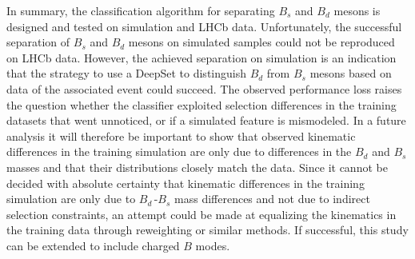 In summary, the classification algorithm for separating $B_s$ and $B_d$ mesons is designed and tested on simulation and LHCb data. 
Unfortunately, the successful separation of $B_s$ and $B_d$ mesons on simulated samples could not be reproduced on LHCb data.
However, the achieved separation on simulation is an indication that the strategy to use a DeepSet to distinguish $B_d$ from $B_s$ mesons based on data of the associated event could succeed. 
The observed performance loss raises the question whether the classifier exploited selection differences in the training datasets that went unnoticed, or if a simulated feature is mismodeled. 
In a future analysis it will therefore be important to show that observed kinematic differences in the training simulation are only due to differences in the $B_d$ and $B_s$ masses and that their distributions closely match the data. Since it cannot be decided with absolute certainty that kinematic differences in the training simulation are only due to $B_d$\,-$B_s$ mass differences and not due to indirect selection constraints, an attempt could be made at equalizing the kinematics in the training data through reweighting or similar methods. 
If successful, this study can be extended to include charged $B$ modes.
